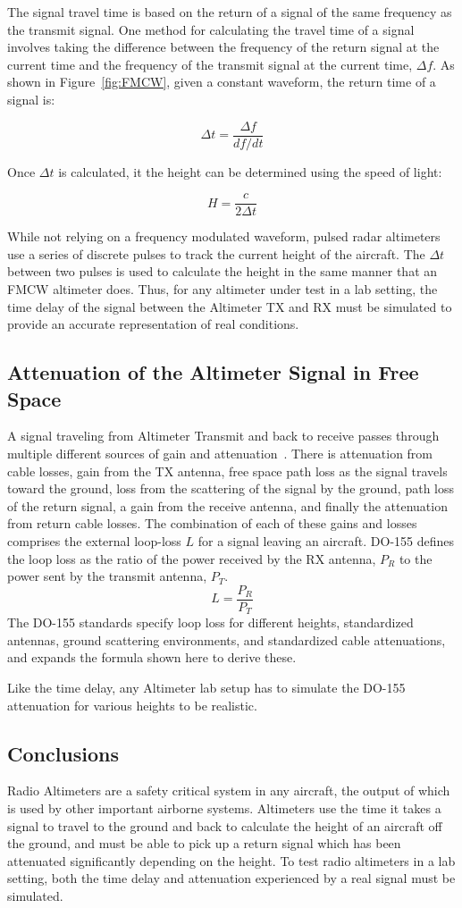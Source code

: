 The signal travel time is based on the return of a signal of the same frequency as the transmit signal. One method for calculating the travel time of a signal involves taking the difference between the frequency of the return signal at the current time and the frequency of the transmit signal at the current time, $\Delta f$. As shown in Figure~\ref{fig:FMCW}, given a constant waveform, the return time of a signal is:

$$\Delta t = \frac{\Delta f}{df/dt}$$

Once $\Delta t$ is calculated, it the height can be determined using the speed of light: 

$$H = \frac{c}{2\Delta t} $$

While not relying on a frequency modulated waveform, pulsed radar altimeters use a series of discrete pulses to track the current height of the aircraft. The $\Delta t$ between two pulses is used to calculate the height in the same manner that an FMCW altimeter does. Thus, for any altimeter under test in a lab setting, the time delay of the signal between the Altimeter TX and RX must be simulated to provide an accurate representation of real conditions. 
\subsection{Attenuation of the Altimeter Signal in Free Space}
A signal traveling from Altimeter Transmit and back to receive passes through multiple different sources of gain and attenuation~\cite{noauthor_minimum_1974}. There is attenuation from cable losses, gain from the TX antenna, free space path loss as the signal travels toward the ground, loss from the scattering of the signal by the ground, path loss of the return signal, a gain from the receive antenna, and finally the attenuation from return cable losses. The combination of each of these gains and losses comprises the external loop-loss $L$ for a signal leaving an aircraft. DO-155 defines the loop loss as the ratio of the power received by the RX antenna, $P_R$ to the power sent by the transmit antenna, $P_T$.
$$ L = \frac{P_R}{P_T}$$
The DO-155 standards specify loop loss for different heights, standardized antennas,  ground scattering environments, and standardized cable attenuations, and expands the formula shown here to derive these.

 Like the time delay, any Altimeter lab setup has to simulate the DO-155 attenuation for various heights to be realistic. 
\subsection{Conclusions}
Radio Altimeters are a safety critical system in any aircraft, the output of which is used by other important airborne systems. Altimeters use the time it takes a signal to travel to the ground and back to calculate the height of an aircraft off the ground, and must be able to pick up a return signal which has been attenuated significantly depending on the height. To test radio altimeters in a lab setting, both the time delay and attenuation experienced by a real signal must be simulated. 
